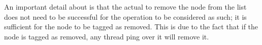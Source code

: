 

An important detail about  is that the actual  to remove the node
from the list does not need to be successful for the operation to be considered as such; it is
sufficient for the node to be tagged as removed. This is due to the fact that if the node is tagged
as removed, any thread ping over it will remove it.
